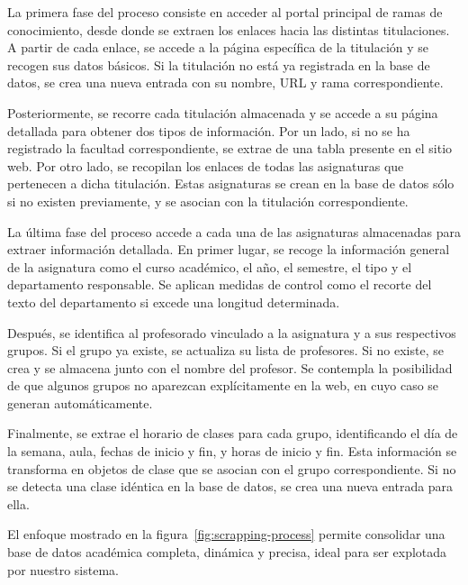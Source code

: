 La primera fase del proceso consiste en acceder al portal principal de ramas de conocimiento, desde donde se extraen los enlaces hacia las distintas titulaciones. A partir de cada enlace, se accede a la página específica de la titulación y se recogen sus datos básicos. Si la titulación no está ya registrada en la base de datos, se crea una nueva entrada con su nombre, URL y rama correspondiente.

Posteriormente, se recorre cada titulación almacenada y se accede a su página detallada para obtener dos tipos de información. Por un lado, si no se ha registrado la facultad correspondiente, se extrae de una tabla presente en el sitio web. Por otro lado, se recopilan los enlaces de todas las asignaturas que pertenecen a dicha titulación. Estas asignaturas se crean en la base de datos sólo si no existen previamente, y se asocian con la titulación correspondiente.

La última fase del proceso accede a cada una de las asignaturas almacenadas para extraer información detallada. En primer lugar, se recoge la información general de la asignatura como el curso académico, el año, el semestre, el tipo y el departamento responsable. Se aplican medidas de control como el recorte del texto del departamento si excede una longitud determinada.

Después, se identifica al profesorado vinculado a la asignatura y a sus respectivos grupos. Si el grupo ya existe, se actualiza su lista de profesores. Si no existe, se crea y se almacena junto con el nombre del profesor. Se contempla la posibilidad de que algunos grupos no aparezcan explícitamente en la web, en cuyo caso se generan automáticamente.

Finalmente, se extrae el horario de clases para cada grupo, identificando el día de la semana, aula, fechas de inicio y fin, y horas de inicio y fin. Esta información se transforma en objetos de clase que se asocian con el grupo correspondiente. Si no se detecta una clase idéntica en la base de datos, se crea una nueva entrada para ella.

El enfoque mostrado en la figura~\ref{fig:scrapping-process} permite consolidar una base de datos académica completa, dinámica y precisa, ideal para ser explotada por nuestro sistema.

